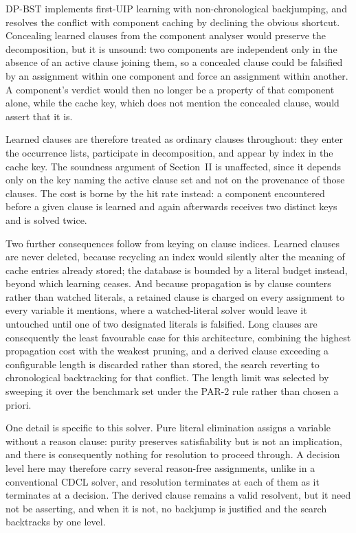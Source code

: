 \documentclass[conference]{IEEEtran}
\begin{document}
DP-BST implements first-UIP learning \cite{marques-silva1999} with non-chronological backjumping,
and resolves the conflict with component caching by declining the obvious shortcut. Concealing
learned clauses from the component analyser would preserve the decomposition, but it is unsound:
two components are independent only in the absence of an active clause joining them, so a
concealed clause could be falsified by an assignment within one component and force an assignment
within another. A component's verdict would then no longer be a property of that component alone,
while the cache key, which does not mention the concealed clause, would assert that it is.

Learned clauses are therefore treated as ordinary clauses throughout: they enter the occurrence
lists, participate in decomposition, and appear by index in the cache key. The soundness argument
of Section~II is unaffected, since it depends only on the key naming the active
clause set and not on the provenance of those clauses. The cost is borne by the hit rate instead:
a component encountered before a given clause is learned and again afterwards receives two
distinct keys and is solved twice.

Two further consequences follow from keying on clause indices. Learned clauses are never deleted,
because recycling an index would silently alter the meaning of cache entries already stored; the
database is bounded by a literal budget instead, beyond which learning ceases. And because
propagation is by clause counters rather than watched literals, a retained clause is charged on
every assignment to every variable it mentions, where a watched-literal solver would leave it
untouched until one of two designated literals is falsified. Long clauses are consequently the
least favourable case for this architecture, combining the highest propagation cost with the
weakest pruning, and a derived clause exceeding a configurable length is discarded rather than
stored, the search reverting to chronological backtracking for that conflict. The length limit
was selected by sweeping it over the benchmark set under the PAR-2 rule rather than chosen a
priori.

One detail is specific to this solver. Pure literal elimination assigns a variable without a
reason clause: purity preserves satisfiability but is not an implication, and there is
consequently nothing for resolution to proceed through. A decision level here may therefore carry
several reason-free assignments, unlike in a conventional CDCL solver, and resolution terminates
at each of them as it terminates at a decision. The derived clause remains a valid resolvent, but
it need not be asserting, and when it is not, no backjump is justified and the search backtracks
by one level.
\end{document}
